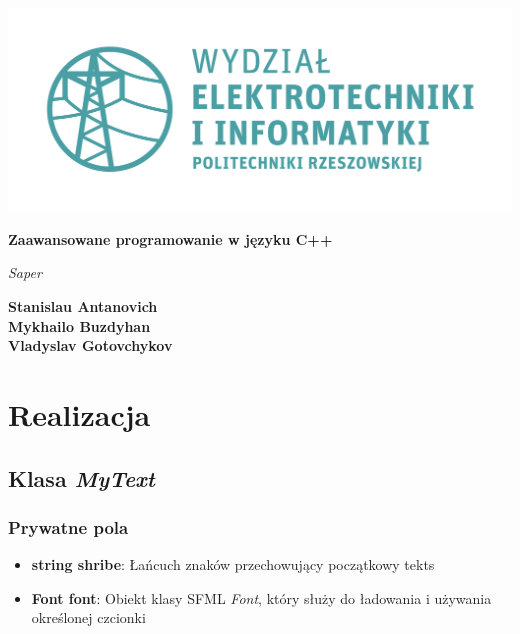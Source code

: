 \documentclass[a4paper, 10pt]{article}
\begin{document}
\begin{titlepage}
	\begin{center}
		\includegraphics[scale=0.7]{logo.png}

		\vspace*{4cm}
		\textbf{Zaawansowane programowanie w języku C++}

		\vspace{1.5cm}
		\textit{Saper}

		\vspace{1.5cm}
		\textbf{Stanislau Antanovich\\Mykhailo Buzdyhan\\Vladyslav Gotovchykov}

		\vspace{4.5cm}
	\end{center}
\end{titlepage}

\tableofcontents

\newpage

\section{Realizacja}

\subsection{Klasa \textit{MyText}}


\subsubsection{Prywatne pola}
\begin{itemize}
	\item \textbf{string shribe}: Łańcuch znaków przechowujący początkowy tekts
	\item \textbf{Font font}: Obiekt klasy SFML \emph{Font}, który służy do ładowania i używania określonej czcionki
\end{itemize}
\end{document}

